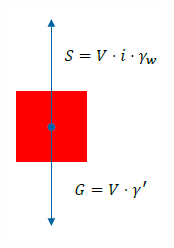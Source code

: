 \begin{minipage}{0.2\linewidth}
	\includegraphics[width=0.5\linewidth]{images/GW21Kraftwirkung.PNG}
\end{minipage}